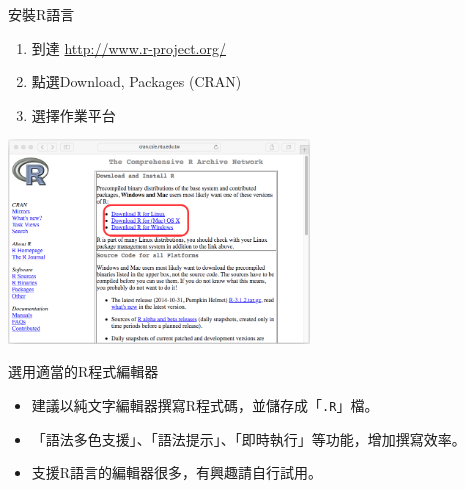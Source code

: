 \documentclass[14pt, aspectratio=43]{beamer}
\let\oldfootnote\footnote
\renewcommand\footnote[1]{\hspace{-0.7em}\oldfootnote{\ignorespaces#1}\hspace{0.5em}}
\begin{document}
\begin{frame}[fragile]{安裝R語言}
\begin{enumerate}
\item 到達 \url{http://www.r-project.org/}
\item 點選Download, Packages (CRAN) \\
\item 選擇作業平台
\end{enumerate}
	\begin{center}\includegraphics[width=0.6\textwidth]{downloadR.png}\end{center}
\end{frame}

\begin{frame}[fragile]{選用適當的R程式編輯器}
\begin{itemize}
\item 建議以純文字編輯器撰寫R程式碼，並儲存成「\verb+.R+」檔。
\item 「語法多色支援」、「語法提示」、「即時執行」等功能，增加撰寫效率。
\item 支援R語言的編輯器很多，有興趣請自行試用。
\end{itemize}
\end{frame}
\end{document}
